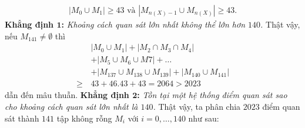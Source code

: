 \begin{multicols}{2}
	\begin{align*}
		|M_0 \cup M_1| \ge 43 \text{ và } |M_{n(X)-1} \cup M_{n(X)}| \ge 43.
	\end{align*}
	\textbf{\color{cackithi}Khẳng định $\pmb{1}$:} \textit{Khoảng cách quan sát lớn nhất không thể lớn hơn $140$.} 
	\vskip 0.1cm
	Thật vậy, nếu $M_{141} \neq \emptyset$ thì 
	\begin{align*}
		& |M_0 \cup M_1| + |M_2 \cap M_3 \cap M_4| \\
		&+ |M_5 \cup M_6 \cup M7| + \ldots \\
		&+ |M_{137} \cup M_{138} \cup M_{139}| + |M_{140} \cup M_{141}| \\
		\ge \,&43 + 46.43 + 43 = 2064 > 2023
	\end{align*}
	dẫn đến mâu thuẫn.
	\vskip 0.1cm
		\textbf{\color{cackithi}Khẳng định $\pmb{2}$:} \textit{Tồn tại một hệ thống điểm quan sát sao cho khoảng cách quan sát lớn nhất là $140$.} 
		\vskip 0.1cm
		Thật vậy, ta phân chia $2023$ điểm quan sát thành $141$ tập không rỗng $M_i$ với $i = 0, \ldots, 140$ như sau:
		\vskip 0.1cm
		\begin{figure}[H]
				\vspace*{-5pt}
				\centering
				\captionsetup{labelformat= empty, justification=centering}
\end{figure}
\end{multicols}
